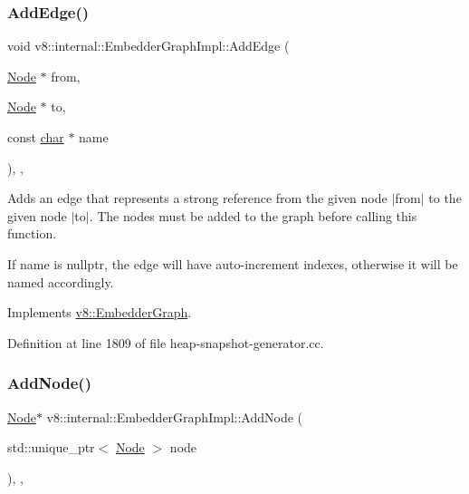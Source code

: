 \subsubsection{\texorpdfstring{Add\+Edge()}{AddEdge()}}
{\footnotesize\ttfamily void v8\+::internal\+::\+Embedder\+Graph\+Impl\+::\+Add\+Edge (\begin{DoxyParamCaption}\item[{\mbox{\hyperlink{classv8_1_1EmbedderGraph_1_1Node}{Node}} $\ast$}]{from,  }\item[{\mbox{\hyperlink{classv8_1_1EmbedderGraph_1_1Node}{Node}} $\ast$}]{to,  }\item[{const \mbox{\hyperlink{classchar}{char}} $\ast$}]{name }\end{DoxyParamCaption})\hspace{0.3cm}{\ttfamily [inline]}, {\ttfamily [final]}, {\ttfamily [virtual]}}

Adds an edge that represents a strong reference from the given node $\vert$from$\vert$ to the given node $\vert$to$\vert$. The nodes must be added to the graph before calling this function.

If name is nullptr, the edge will have auto-\/increment indexes, otherwise it will be named accordingly. 

Implements \mbox{\hyperlink{classv8_1_1EmbedderGraph_a81b1c7dd4d0387ec50037b0778b8af11}{v8\+::\+Embedder\+Graph}}.



Definition at line 1809 of file heap-\/snapshot-\/generator.\+cc.

\mbox{\label{classv8_1_1internal_1_1EmbedderGraphImpl_a13ad2b317c1c89b9647af9ec9f006c7f}} 
\subsubsection{\texorpdfstring{Add\+Node()}{AddNode()}}
{\footnotesize\ttfamily \mbox{\hyperlink{classv8_1_1EmbedderGraph_1_1Node}{Node}}$\ast$ v8\+::internal\+::\+Embedder\+Graph\+Impl\+::\+Add\+Node (\begin{DoxyParamCaption}\item[{std\+::unique\+\_\+ptr$<$ \mbox{\hyperlink{classv8_1_1EmbedderGraph_1_1Node}{Node}} $>$}]{node }\end{DoxyParamCaption})\hspace{0.3cm}{\ttfamily [inline]}, {\ttfamily [final]}, {\ttfamily [virtual]}}


